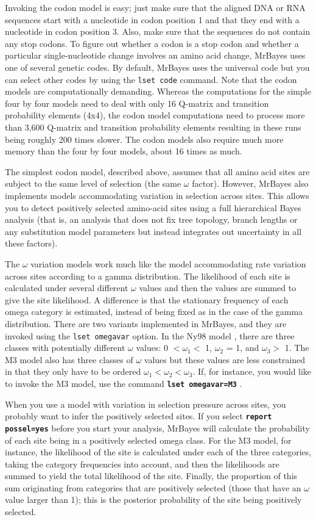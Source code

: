 \documentclass[12pt]{book}
\newcommand{\ttt}[1]{\texttt{#1} }
\newcommand{\tb}[1]{\texttt{\textbf{#1}} }
\begin{document}
Invoking the codon model is easy; just make sure that the aligned DNA or RNA sequences start with a
nucleotide in codon position 1 and that they end with a nucleotide in codon position 3. Also, make
sure that the sequences do not contain any stop codons.  To figure out whether a codon is a stop
codon and whether a particular single-nucleotide change involves an amino acid change, MrBayes uses
one of several genetic codes. By default, MrBayes uses the universal code but you can select other
codes by using the \ttt{lset code} command. Note that the codon models are computationally
demanding.  Whereas the computations for the simple four by four models need to deal with only 16
Q-matrix and transition probability elements (4x4), the codon model computations need to process
more than 3,600 Q-matrix and transition probability elements resulting in these runs being roughly
200 times slower. The codon models also require much more memory than the four by four models,
about 16 times as much.

The simplest codon model, described above, assumes that all amino acid sites are subject to the
same level of selection (the same $\omega$ factor). However, MrBayes also implements models
accommodating variation in selection across sites. This allows you to detect positively selected
amino-acid sites using a full hierarchical Bayes analysis (that is, an analysis that does not fix
tree topology, branch lengths or any substitution model parameters but instead integrates out
uncertainty in all these factors).

The $\omega$ variation models work much like the model accommodating rate variation across sites
according to a gamma distribution. The likelihood of each site is calculated under several
different $\omega$ values and then the values are summed to give the site likelihood. A difference
is that the stationary frequency of each omega category is estimated, instead of being fixed as in
the case of the gamma distribution. There are two variants implemented in MrBayes, and they are
invoked using the \ttt{lset omegavar} option. In the Ny98 model \citep{nielsen98}, there are three
classes with potentially different $\omega$ values: 0 $< \omega_1 <$ 1, $\omega_2$ = 1, and
$\omega_3 >$ 1. The M3 model also has three classes of $\omega$ values but these values are less
constrained in that they only have to be ordered $\omega_1 < \omega_2 < \omega_3$.  If, for
instance, you would like to invoke the M3 model, use the command \tb{lset omegavar=M3}.

When you use a model with variation in selection pressure across sites, you probably want to infer
the positively selected sites. If you select \tb{report possel=yes} before you start your analysis,
MrBayes will calculate the probability of each site being in a positively selected omega class. For
the M3 model, for instance, the likelihood of the site is calculated under each of the three
categories, taking the category frequencies into account, and then the likelihoods are summed to
yield the total likelihood of the site.  Finally, the proportion of this sum originating from
categories that are positively selected (those that have an $\omega$ value larger than 1); this is
the posterior probability of the site being positively selected.
\end{document}
